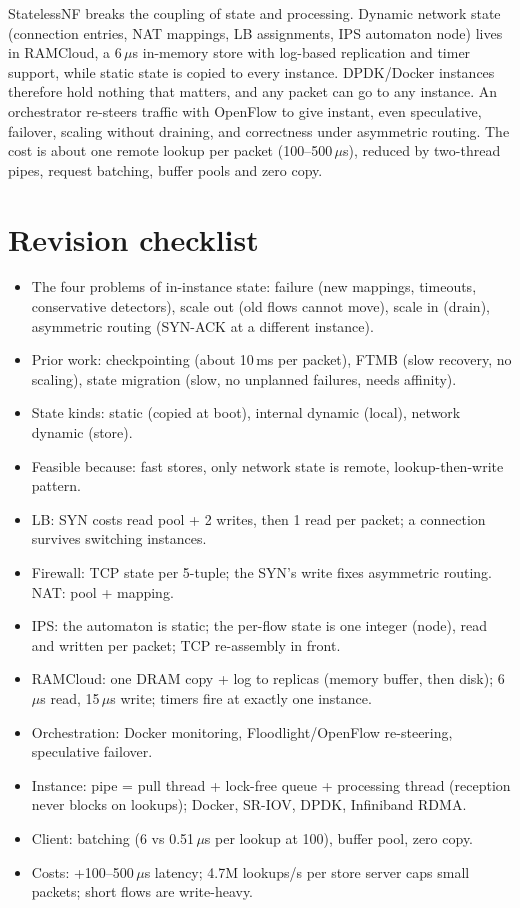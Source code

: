 \begin{keybox}
StatelessNF breaks the coupling of state and processing. Dynamic network state (connection entries, NAT mappings, LB assignments, IPS
automaton node) lives in RAMCloud, a 6\,$\mu$s in-memory store with log-based replication and timer support, while static state is copied to
every instance. DPDK/Docker instances therefore hold nothing that matters, and any packet can go to any instance. An orchestrator
re-steers traffic with OpenFlow to give instant, even speculative, failover, scaling without draining, and correctness under asymmetric
routing. The cost is about one remote lookup per packet (100--500\,$\mu$s), reduced by two-thread pipes, request batching, buffer pools and zero copy.
\end{keybox}

\section{Revision checklist}
\begin{itemize}
  \item The four problems of in-instance state: failure (new mappings, timeouts, conservative detectors), scale out (old flows cannot move),
        scale in (drain), asymmetric routing (SYN-ACK at a different instance).
  \item Prior work: checkpointing (about 10\,ms per packet), FTMB (slow recovery, no scaling), state migration (slow, no unplanned failures, needs affinity).
  \item State kinds: static (copied at boot), internal dynamic (local), network dynamic (store).
  \item Feasible because: fast stores, only network state is remote, lookup-then-write pattern.
  \item LB: SYN costs read pool + 2 writes, then 1 read per packet; a connection survives switching instances.
  \item Firewall: TCP state per 5-tuple; the SYN's write fixes asymmetric routing. NAT: pool + mapping.
  \item IPS: the automaton is static; the per-flow state is one integer (node), read and written per packet; TCP re-assembly in front.
  \item RAMCloud: one DRAM copy + log to replicas (memory buffer, then disk); 6\,$\mu$s read, 15\,$\mu$s write; timers fire at exactly one instance.
  \item Orchestration: Docker monitoring, Floodlight/OpenFlow re-steering, speculative failover.
  \item Instance: pipe = pull thread + lock-free queue + processing thread (reception never blocks on lookups); Docker, SR-IOV, DPDK, Infiniband RDMA.
  \item Client: batching (6 vs 0.51\,$\mu$s per lookup at 100), buffer pool, zero copy.
  \item Costs: +100--500\,$\mu$s latency; 4.7M lookups/s per store server caps small packets; short flows are write-heavy.
\end{itemize}
